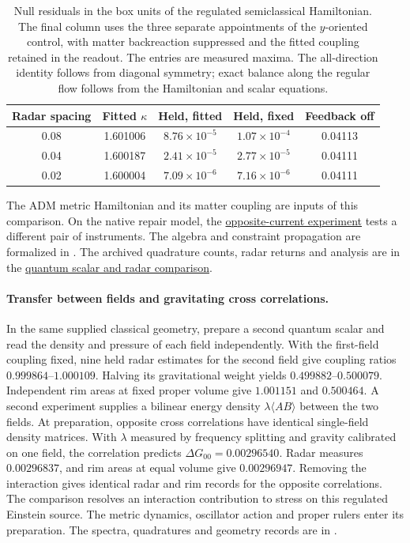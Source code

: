 \documentclass[11pt]{article}
\begin{document}
\begin{table}[htbp]
\centering\small
\begin{tabular}{ccccc}
\hline
Radar spacing & Fitted $\kappa$ & Held, fitted & Held, fixed & Feedback off\\
\hline
0.08 & 1.601006 & $8.76\times10^{-5}$ & $1.07\times10^{-4}$ & 0.04113\\
0.04 & 1.600187 & $2.41\times10^{-5}$ & $2.77\times10^{-5}$ & 0.04111\\
0.02 & 1.600004 & $7.09\times10^{-6}$ & $7.16\times10^{-6}$ & 0.04111\\
\hline
\end{tabular}
\caption{Null residuals in the box units of the regulated semiclassical
Hamiltonian. The final column uses the three separate appointments of the
$y$-oriented control, with matter backreaction suppressed and the fitted
coupling retained in the readout. The entries are measured maxima. The
all-direction identity follows from diagonal symmetry; exact balance
along the regular flow follows from the Hamiltonian and scalar equations.}
\label{tab:all-sky-radar}
\end{table}

The ADM metric Hamiltonian and its matter coupling are inputs of this
comparison. On the native repair model, the
\hyperref[par:ray-pair-native-current]{opposite-current experiment}
tests a different pair of instruments. The algebra and constraint
propagation are formalized in
.
The archived quadrature counts, radar returns and analysis are in the
\href{https://github.com/FloatingPragma/observer-patch-holography/tree/main/code/matched_einstein_limit/quantum_scalar_radar}
{quantum scalar and radar comparison}.

\paragraph{Transfer between fields and gravitating cross correlations.}
In the same supplied classical geometry, prepare a second quantum
scalar and read the density and pressure of each field independently.
With the first-field coupling fixed, nine held radar estimates for the
second field give coupling ratios $0.999864$--$1.000109$. Halving its
gravitational weight yields $0.499882$--$0.500079$. Independent rim
areas at fixed proper volume give $1.001151$ and $0.500464$.
A second experiment supplies a bilinear energy density
$\lambda\langle AB\rangle$ between the two fields. At preparation,
opposite cross correlations have identical single-field density
matrices. With $\lambda$ measured by frequency splitting and gravity
calibrated on one field, the correlation predicts
$\Delta G_{00}=0.00296540$. Radar measures $0.00296837$, and rim
areas at equal volume give $0.00296947$. Removing the interaction
gives identical radar and rim records for the opposite correlations.
The comparison resolves an interaction contribution to stress on
this regulated Einstein source. The metric dynamics, oscillator
action and proper rulers enter its preparation. The spectra,
quadratures and geometry records are in
.
\end{document}
